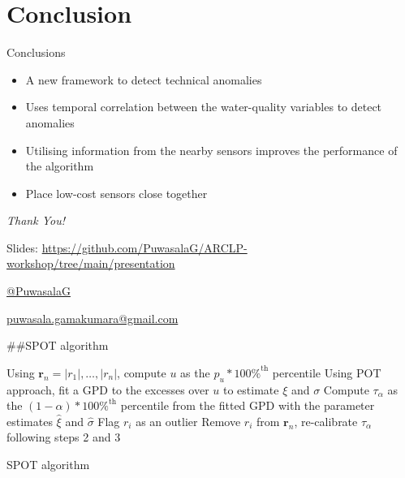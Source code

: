 \documentclass[14pt,ignorenonframetext,compress]{beamer}
\begin{document}
\hypertarget{conclusion}{%
\section{Conclusion}\label{conclusion}}

\begin{frame}{Conclusions}
\protect\hypertarget{conclusions}{}
\begin{itemize}
\item
  A new framework to detect technical anomalies
\item
  Uses temporal correlation between the water-quality variables to
  detect anomalies
\item
  Utilising information from the nearby sensors improves the performance
  of the algorithm
\item
  Place low-cost sensors close together
\end{itemize}
\end{frame}

\begin{frame}
\begin{center}
\Huge \emph{Thank You!}
\end{center}

\begin{block}{}
Slides: \textcolor{blue}{\url{https://github.com/PuwasalaG/ARCLP-workshop/tree/main/presentation}}
\vspace*{1cm}

\href{https://github.com/PuwasalaG}{  @PuwasalaG}

\href{mailto:puwasala.gamakumara@gmail.com}{  puwasala.gamakumara@gmail.com}
\end{block}
\end{frame}

\begin{frame}
\#\#SPOT algorithm

\small
\begin{algorithm}[htb] \label{SPOT_algo}
\DontPrintSemicolon
\SetAlgoLined
{}
\BlankLine
Using $\bm{r}_n = |r_1|,\dots,|r_n|$, compute $u$ as the $p_u*100\%^\text{th}$ percentile\;
Using POT approach, fit a GPD to the excesses over $u$ to estimate 
$\xi$ and $\sigma$\;
Compute $\tau_{\alpha}$ as the $(1-\alpha)*100\%^\text{th}$ percentile from the fitted GPD with the parameter estimates $\hat{\xi}$ and $\hat{\sigma}$\;
 {
  Flag $r_i$ as an outlier\;
  Remove $r_i$ from $\bm{r}_n$, re-calibrate $\tau_{\alpha}$ following steps 2 and 3 \;
  } 
\BlankLine
{}
\caption{SPOT algorithm}
\end{algorithm}
\end{frame}
\end{document}
